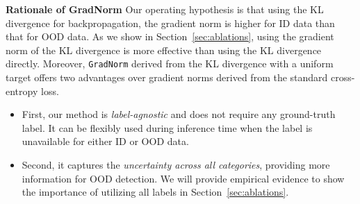 \documentclass{article}
\def\*#1{\mathbf{#1}}
\begin{document}






\textbf{Rationale of {GradNorm}} Our operating hypothesis is that using the KL divergence for backpropagation, the gradient norm is higher for ID data than that for OOD data. As we show in Section~\ref{sec:ablations}, using the gradient norm of the KL divergence is more effective than using the KL divergence directly.
Moreover, \texttt{GradNorm} derived from the KL divergence with a uniform target offers two advantages over gradient norms derived from the standard cross-entropy loss.
\vspace{-0.2cm}
\begin{itemize}
\itemsep0em
    \item First, our method is \emph{label-agnostic} and does not require any ground-truth label. It can be flexibly used during inference time when the label is unavailable for either ID or OOD data. 
    \item  Second, it captures the \emph{uncertainty across all categories}, providing more information for OOD detection. We will provide empirical evidence to show the importance of utilizing all labels in Section~\ref{sec:ablations}.
\end{itemize}
\end{document}
